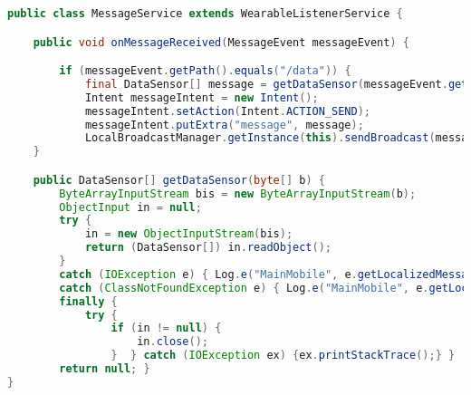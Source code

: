 \begin{lstlisting}[language=Java,  basicstyle=\footnotesize]
public class MessageService extends WearableListenerService {

    public void onMessageReceived(MessageEvent messageEvent) {

        if (messageEvent.getPath().equals("/data")) {
            final DataSensor[] message = getDataSensor(messageEvent.getData());
            Intent messageIntent = new Intent();
            messageIntent.setAction(Intent.ACTION_SEND);
            messageIntent.putExtra("message", message);
            LocalBroadcastManager.getInstance(this).sendBroadcast(messageIntent); }
    }

    public DataSensor[] getDataSensor(byte[] b) {
        ByteArrayInputStream bis = new ByteArrayInputStream(b);
        ObjectInput in = null;
        try {
            in = new ObjectInputStream(bis);
            return (DataSensor[]) in.readObject();
        }
        catch (IOException e) { Log.e("MainMobile", e.getLocalizedMessage(), e);}
        catch (ClassNotFoundException e) { Log.e("MainMobile", e.getLocalizedMessage(), e); }
        finally {
            try {
                if (in != null) {
                    in.close();
                }  } catch (IOException ex) {ex.printStackTrace();} }
        return null; }
}
\end{lstlisting}